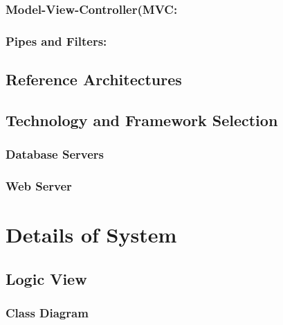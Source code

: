 \documentclass[12pt]{article}
\begin{document}
	\subsubsection{Model-View-Controller(MVC:}



	\subsubsection{Pipes and Filters:}



	\subsection{Reference Architectures}



	\subsection{Technology and Framework Selection}



	\subsubsection{Database Servers}



	\subsubsection{Web Server}



\section{Details of System}

	\subsection {Logic View}
	
	

	\subsubsection{Class Diagram}
\end{document}
